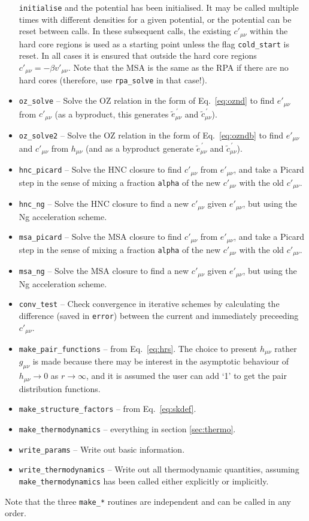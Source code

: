 \documentclass[12pt,a4paper]{article}
\newcommand{\myprime}{^{{}\,\prime}}
\newcommand{\Eqref}[1]{Eq.~\eqref{#1}}
\begin{document}
\begin{itemize}
  \verb+initialise+ and the potential has been initialised.  It may be
  called multiple times with different densities for a given
  potential, or the potential can be reset between calls.  In
  these subsequent calls, the existing $c'_{\mu\nu}$ within the hard
  core regions is used as a starting point unless the flag
  \verb+cold_start+ is reset. In all cases it is ensured that outside
  the hard core regions $c'_{\mu\nu}=-\beta v'_{\mu\nu}$. Note that the
  MSA is the same as the RPA if there are no hard cores (therefore, use
  \verb+rpa_solve+ in that case!).
%
\item\verb+oz_solve+ -- Solve the OZ relation in the form of
  \Eqref{eq:oznd} to find $e'_{\mu\nu}$ from $c'_{\mu\nu}$ (as a
  byproduct, this generates ${\tilde e}_{\mu\nu}\myprime$ and ${\tilde
    c}_{\mu\nu}\myprime$).
%
\item\verb+oz_solve2+ -- Solve the OZ relation in the form of
  \Eqref{eq:ozndb} to find $e'_{\mu\nu}$ and $c'_{\mu\nu}$ from
  $h_{\mu\nu}$ (and as a byproduct generate ${\tilde
    e}_{\mu\nu}\myprime$ and ${\tilde c}_{\mu\nu}\myprime$).
%
\item\verb+hnc_picard+ -- Solve the HNC closure to find $c'_{\mu\nu}$
  from $e'_{\mu\nu}$, and take a Picard step in the sense of mixing a
  fraction \verb+alpha+ of the new $c'_{\mu\nu}$ with the old
  $c'_{\mu\nu}$.
%
\item\verb+hnc_ng+ -- Solve the HNC closure to find a new
$c'_{\mu\nu}$ given $e'_{\mu\nu}$, but using the Ng acceleration scheme.
%
\item\verb+msa_picard+ -- Solve the MSA closure to find $c'_{\mu\nu}$
  from $e'_{\mu\nu}$, and take a Picard step in the sense of mixing a
  fraction \verb+alpha+ of the new $c'_{\mu\nu}$ with the old
  $c'_{\mu\nu}$.
%
\item\verb+msa_ng+ -- Solve the MSA closure to find a new
$c'_{\mu\nu}$ given $e'_{\mu\nu}$, but using the Ng acceleration scheme.
%
\item\verb+conv_test+ -- Check convergence in iterative schemes by
  calculating the difference (saved in \verb+error+) between the
  current and immediately preceeding $c'_{\mu\nu}$.
%
\item\verb+make_pair_functions+ -- from \Eqref{eq:hrs}.  The
  choice to present $h_{\mu\nu}$ rather $g_{\mu\nu}$ is made because
  there may be interest in the asymptotic behaviour of
  $h_{\mu\nu}\to0$ as $r\to\infty$, and it is assumed the user can add
  `1' to get the pair distribution functions.
%
\item\verb+make_structure_factors+ -- from \Eqref{eq:skdef}.
%
\item\verb+make_thermodynamics+ -- everything in section
  \ref{sec:thermo}.
%
\item\verb+write_params+ -- Write out basic information.
%
\item\verb+write_thermodynamics+ -- Write out all thermodynamic
  quantities, assuming \verb+make_thermodynamics+ has been called
  either explicitly or implicitly.
%
\end{itemize}
%
Note that the three \verb+make_*+ routines are independent and can be
called in any order.
\end{document}
